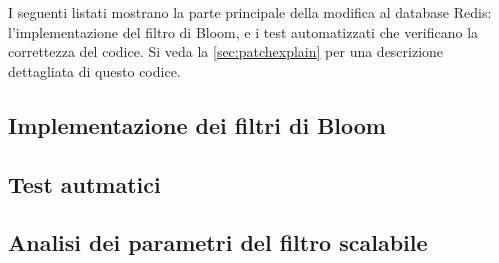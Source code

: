 I seguenti listati mostrano la parte principale della modifica al database Redis:
l'implementazione del filtro di Bloom, e i test automatizzati che verificano la correttezza
del codice. Si veda la \autoref{sec:patchexplain} per una descrizione dettagliata di questo codice.

\subsection{Implementazione dei filtri di Bloom}

\subsection{Test autmatici}
\label{sec:code:test}

\subsection{Analisi dei parametri del filtro scalabile}
